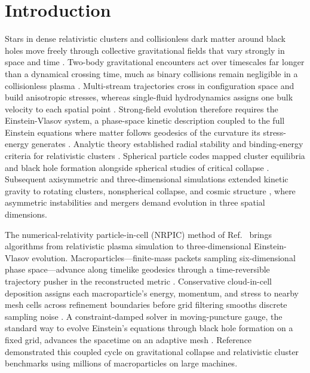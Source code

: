 \section{Introduction}\label{sec:intro}

Stars in dense relativistic clusters and collisionless dark matter around black holes move freely through collective gravitational fields that vary strongly in space and time \cite{1985ApJ...298...34S,2008gady.book.....B,Andreasson:2011ng,Angulo:2021kes,Bamber:2025gxj}. Two-body gravitational encounters act over timescales far longer than a dynamical crossing time, much as binary collisions remain negligible in a collisionless plasma \cite{1991ppcs.book.....B,2008gady.book.....B}. Multi-stream trajectories cross in configuration space and build anisotropic stresses, whereas single-fluid hydrodynamics assigns one bulk velocity to each spatial point \cite{Andreasson:2011ng,East:2019chx}. Strong-field evolution therefore requires the Einstein-Vlasov system, a phase-space kinetic description coupled to the full Einstein equations where matter follows geodesics of the curvature its stress-energy generates \cite{Andreasson:2011ng,Sarbach:2013fya,Acuna-Cardenas:2021nkj}. Analytic theory established radial stability and binding-energy criteria for relativistic clusters \cite{1968ApJ...154..251I,1980ApJ...238.1101I}. Spherical particle codes mapped cluster equilibria and black hole formation \cite{1985ApJ...298...34S,1985ApJ...298...58S} alongside spherical studies of critical collapse \cite{Rein:1998uf,Olabarrieta:2001wy,Akbarian:2014gna}. Subsequent axisymmetric and three-dimensional simulations extended kinetic gravity to rotating clusters, nonspherical collapse, and cosmic structure \cite{Abrahams:1994ge,Shibata:1999va,Shibata:1999wi,East:2019bwu,East:2019chx,Ames:2020ssl}, where asymmetric instabilities and mergers demand evolution in three spatial dimensions.

The numerical-relativity particle-in-cell (NRPIC) method of Ref.~\cite{Wu:2026nrpic} brings algorithms from relativistic plasma simulation \cite{1988csup.book.....H,1991ppcs.book.....B,Spitkovsky:2005vsy,Cerutti:2013mma,EntityDevelopmentTeam:2025tlp} to three-dimensional Einstein-Vlasov evolution. Macroparticles---finite-mass packets sampling six-dimensional phase space---advance along timelike geodesics through a time-reversible trajectory pusher in the reconstructed metric \cite{boris1970relativistic,Bacchini:2020cze,Olivares:2021cfa,Boyeneni:2025tsx,Wu:2026nrpic}. Conservative cloud-in-cell deposition assigns each macroparticle's energy, momentum, and stress to nearby mesh cells across refinement boundaries before grid filtering smooths discrete sampling noise \cite{1988csup.book.....H,1991ppcs.book.....B,Myers:2021gfn,Wu:2026nrpic}. A constraint-damped solver in moving-puncture gauge, the standard way to evolve Einstein's equations through black hole formation on a fixed grid, advances the spacetime on an adaptive mesh \cite{Bona:2003fj,Campanelli:2005dd,Baker:2005vv,Hilditch:2012fp,Wu:2026nrpic}. Reference~\cite{Wu:2026nrpic} demonstrated this coupled cycle on gravitational collapse and relativistic cluster benchmarks using millions of macroparticles on large machines.

